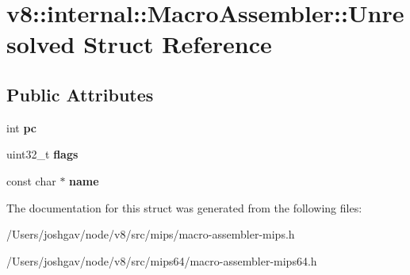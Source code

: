 \hypertarget{structv8_1_1internal_1_1_macro_assembler_1_1_unresolved}{}\section{v8\+:\+:internal\+:\+:Macro\+Assembler\+:\+:Unresolved Struct Reference}
\label{structv8_1_1internal_1_1_macro_assembler_1_1_unresolved}
\subsection*{Public Attributes}
\begin{DoxyCompactItemize}
\item 
int {\bfseries pc}\hypertarget{structv8_1_1internal_1_1_macro_assembler_1_1_unresolved_abbd7200722628c36a96dbdbcd54cf9f7}{}\label{structv8_1_1internal_1_1_macro_assembler_1_1_unresolved_abbd7200722628c36a96dbdbcd54cf9f7}

\item 
uint32\+\_\+t {\bfseries flags}\hypertarget{structv8_1_1internal_1_1_macro_assembler_1_1_unresolved_a36be4d04a5523722304cab2671bd8ca9}{}\label{structv8_1_1internal_1_1_macro_assembler_1_1_unresolved_a36be4d04a5523722304cab2671bd8ca9}

\item 
const char $\ast$ {\bfseries name}\hypertarget{structv8_1_1internal_1_1_macro_assembler_1_1_unresolved_a027a8280335a72142e47cf7722f08b10}{}\label{structv8_1_1internal_1_1_macro_assembler_1_1_unresolved_a027a8280335a72142e47cf7722f08b10}

\end{DoxyCompactItemize}


The documentation for this struct was generated from the following files\+:\begin{DoxyCompactItemize}
\item 
/\+Users/joshgav/node/v8/src/mips/macro-\/assembler-\/mips.\+h\item 
/\+Users/joshgav/node/v8/src/mips64/macro-\/assembler-\/mips64.\+h\end{DoxyCompactItemize}
